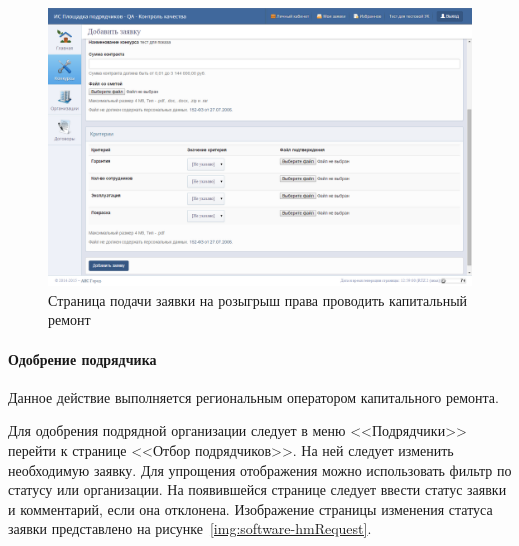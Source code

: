 \begin{figure}[h!]
	\begin{center}
		\begin{minipage}[h]{\linewidth}
			\centering
			\includegraphics[width=\linewidth]{images/software-contractorBid.png}
			\caption{Страница подачи заявки на розыгрыш права проводить капитальный ремонт}
			\label{img:software-contractorBid}
		\end{minipage}
		\hfill
	\end{center}
\end{figure}

\paragraph{Одобрение подрядчика}

Данное действие выполняется региональным оператором капитального ремонта.

Для одобрения подрядной организации следует в меню <<Подрядчики>> перейти к странице <<Отбор подрядчиков>>.
На ней следует изменить необходимую заявку.
Для упрощения отображения можно использовать фильтр по статусу или организации.
На появившейся странице следует ввести статус заявки и комментарий, если она отклонена.
Изображение страницы изменения статуса заявки представлено на рисунке~\ref{img:software-hmRequest}.

